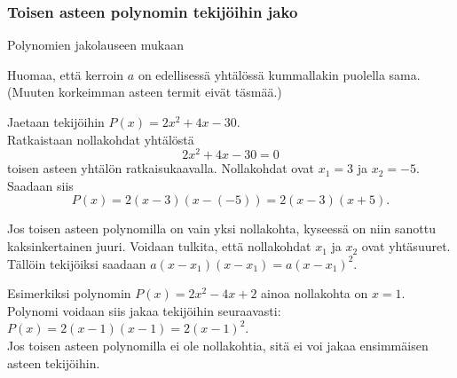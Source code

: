 \subsubsection*{Toisen asteen polynomin tekijöihin jako}

Polynomien jakolauseen mukaan

Huomaa, että kerroin $a$ on edellisessä yhtälössä kummallakin puolella sama.
(Muuten korkeimman asteen termit eivät täsmää.)

\begin{esimerkki}
Jaetaan tekijöihin $P(x)=2x^2 + 4x-30$. \\
Ratkaistaan nollakohdat yhtälöstä $$2x^2 + 4x-30=0$$ toisen asteen yhtälön ratkaisukaavalla.
Nollakohdat ovat $x_1=3$ ja $x_2=-5$. Saadaan siis
$$P(x)= 2(x-3)(x-(-5)) = 2(x-3)(x+5).$$
\end{esimerkki}

Jos toisen asteen polynomilla on vain yksi nollakohta, kyseessä on niin sanottu kaksinkertainen juuri. Voidaan tulkita, että nollakohdat $x_1$ ja $x_2$ ovat yhtäsuuret. Tällöin tekijöiksi saadaan $a(x-x_1)(x-x_1)=a(x-x_1)^2$.

Esimerkiksi polynomin $P(x)=2x^2-4x+2$ ainoa nollakohta on $x=1$. Polynomi voidaan siis jakaa tekijöihin seuraavasti: \\ $P(x)=2(x-1)(x-1)=2(x-1)^2$. \\

Jos toisen asteen polynomilla ei ole nollakohtia, sitä ei voi jakaa ensimmäisen asteen tekijöihin. %

